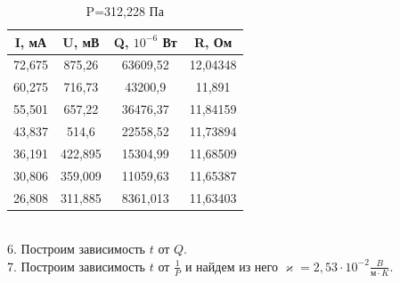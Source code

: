 \documentclass[a4paper]{article}
\begin{document}
	\begin{table}[]
 		\centering
    	\begin{tabular}{| c | c | c | c |}
    		\hline
    		I, мА & U, мВ & Q, $10^{-6}$ Вт & R, Ом \\
    		\hline
    		72,675 &	875,26&	63609,52&	12,04348\\
    		\hline
60,275	&716,73	&43200,9	&11,891\\
    		\hline
55,501&	657,22	&36476,37	&11,84159\\
    		\hline
43,837	&514,6	&22558,52&	11,73894\\
    		\hline
36,191	&422,895	&15304,99&	11,68509\\
    		\hline
30,806	&359,009	&11059,63&	11,65387\\
    		\hline
26,808	&311,885	&8361,013	&11,63403\\
    		\hline
    	\end{tabular}
    	\caption{P=312,228 Па}
	\end{table}
	\\6. Построим зависимость $t$ от $Q$.
	\\7. Построим зависимость $t$ от $\frac{1}{P}$ и найдем из него $\varkappa=2,53\cdot10^{-2} \frac{B}{\text{м}\cdot K}$.
\end{document}
